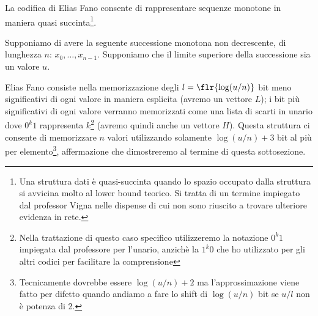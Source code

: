 La codifica di Elias Fano consente di rappresentare sequenze monotone in maniera quasi succinta\footnote{Una struttura dati è quasi-succinta quando lo spazio occupato dalla struttura si avvicina molto al lower bound teorico. Si tratta di un termine impiegato dal professor Vigna nelle dispense di cui non sono riuscito a trovare ulteriore evidenza in rete.}.

Supponiamo di avere la seguente successione monotona non decrescente, di lunghezza $n$: $x_0, \dots, x_{n - 1}$. Supponiamo che il limite superiore della successione sia un valore $u$.

Elias Fano consiste nella memorizzazione degli $l = \flr{\log(u / n)}$ bit meno significativi di ogni valore in maniera esplicita (avremo un vettore $L$); i bit più significativi di ogni valore verranno memorizzati come una lista di scarti in unario dove $0^k1$ rappresenta $k$\footnote{Nella trattazione di questo caso specifico utilizzeremo la notazione $0^k1$ impiegata dal professore per l'unario, anzichè la $1^k0$ che ho utilizzato per gli altri codici per facilitare la comprensione} (avremo quindi anche un vettore $H$). Questa struttura ci consente di memorizzare $n$ valori utilizzando solamente $\log(u / n) + 3$ bit al più per elemento\footnote{Tecnicamente dovrebbe essere $\log(u / n) + 2$ ma l'approssimazione viene fatto per difetto quando andiamo a fare lo shift di $\log(u / n)$ bit se $u / l$ non è potenza di 2.}, affermazione che dimostreremo al termine di questa sottosezione.


